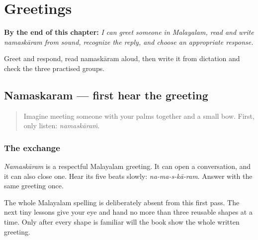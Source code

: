 
\chapter{Greetings}
\label{ch:greetings}

\begin{chapteropening}
\textbf{By the end of this chapter:} \emph{I can greet someone in Malayalam, read and write namaskāram from sound, recognize the reply, and choose an appropriate response.}

Greet and respond, read namaskāram aloud, then write it from dictation and check the three practised groups.
\end{chapteropening}

\section[\texorpdfstring{\ml{നമസ്കാരം} (namaskāraṁ)}{നമസ്കാരം (namaskāraṁ)}]{Namaskaram — first hear the greeting}

\label{lesson:ML-C01-namaskaram}



\begin{quote}
Imagine meeting someone with your palms together and a small bow. First, only listen: \emph{namaskāraṁ}.
\end{quote}

\subsection*{The exchange}
\emph{Namaskāram} is a respectful Malayalam greeting. It can open a conversation, and it can also close one. Hear its five beats slowly: \emph{na-ma-s-kā-ram}. Answer with the same greeting once.

The whole Malayalam spelling is deliberately absent from this first pass. The next tiny lessons give your eye and hand no more than three reusable shapes at a time. Only after every shape is familiar will the book show the whole written greeting.

